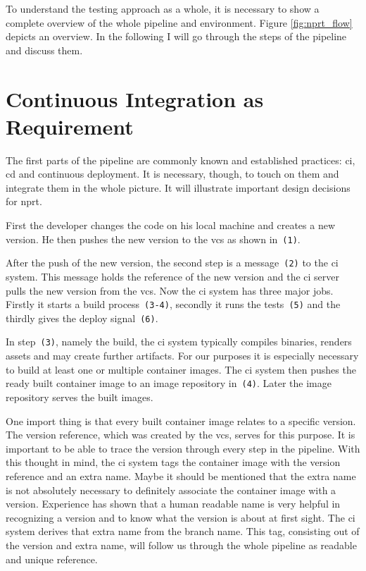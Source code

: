 To understand the testing approach as a whole, it is necessary to show a complete overview
of the whole pipeline and environment. Figure \ref{fig:nprt_flow} depicts an overview. In
the following I will go through the steps of the pipeline and discuss them.

\section{Continuous Integration as Requirement}

The first parts of the pipeline are commonly known and established practices: \gls{ci},
\gls{cd} and continuous deployment. It is necessary, though, to touch on them and
integrate them in the whole picture. It will illustrate important design decisions for
\gls{nprt}.

First the developer changes the code on his local machine and creates a new version. He
then pushes the new version to the \gls{vcs} as shown in~\texttt{(1)}.

After the push of the new version, the second step is a message~\texttt{(2)} to the
\gls{ci} system. This message holds the reference of the new version and the \gls{ci}
server pulls the new version from the \gls{vcs}. Now the \gls{ci} system has three major
jobs. Firstly it starts a build process~\texttt{(3-4)}, secondly it runs the
tests~\texttt{(5)} and the thirdly gives the deploy signal~\texttt{(6)}.

In step~\texttt{(3)}, namely the build, the \gls{ci} system typically compiles binaries,
renders assets and may create further artifacts. For our purposes it is especially
necessary to build at least one or multiple container images. The \gls{ci} system then
pushes the ready built container image to an image repository in~\texttt{(4)}. Later the
image repository serves the built images.

One import thing is that every built container image relates to a specific version. The
version reference, which was created by the \gls{vcs}, serves for this purpose. It is
important to be able to trace the version through every step in the pipeline. With this
thought in mind, the \gls{ci} system tags the container image with the version reference
and an extra name. Maybe it should be mentioned that the extra name is not absolutely necessary to
definitely associate the container image with a version. Experience has shown that a human
readable name is very helpful in recognizing a version and to know what the version is about
at first sight. The \gls{ci} system derives that extra name from the branch name. This
tag, consisting out of the version and extra name, will follow us through the whole
pipeline as readable and unique reference.

